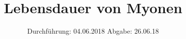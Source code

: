 

\subject{V01}
\title{Lebensdauer von Myonen}
\date{
  Durchführung: 04.06.2018
  \hspace{3em}
  Abgabe: 26.06.18
}



\maketitle
\thispagestyle{empty}
\tableofcontents
\newpage
\setcounter{page}{1}





\printbibliography


